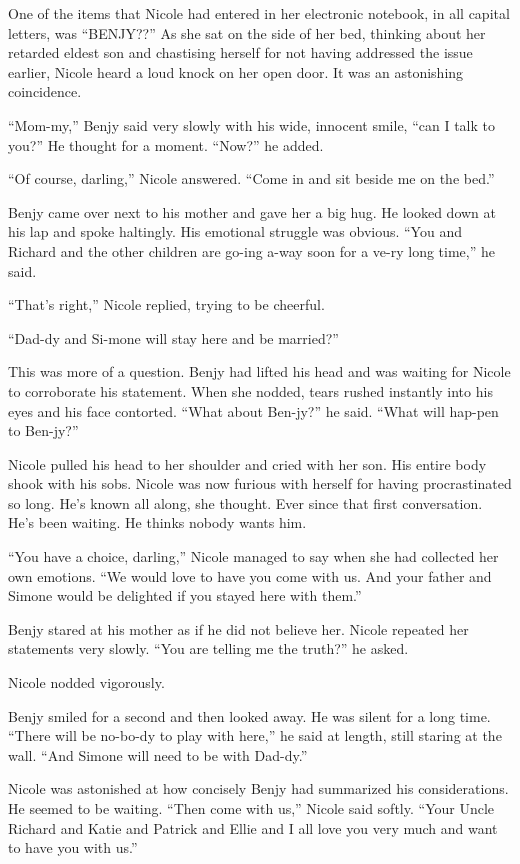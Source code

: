 \documentclass[]{article}
\begin{document}
{One of the items that Nicole had entered in her electronic notebook, in all capital letters, was “BENJY??” As she sat on the side of her bed, thinking about her retarded eldest son and chastising herself for not having addressed the issue earlier, Nicole heard a loud knock on her open door. It was an astonishing coincidence.

“Mom-my,” Benjy said very slowly with his wide, innocent smile, “can I talk to you?” He thought for a moment. “Now?” he added.

“Of course, darling,” Nicole answered. “Come in and sit beside me on the bed.”

Benjy came over next to his mother and gave her a big hug. He looked down at his lap and spoke haltingly. His emotional struggle was obvious. “You and Richard and the other children are go-ing a-way soon for a ve-ry long time,” he said.

“That’s right,” Nicole replied, trying to be cheerful.

“Dad-dy and Si-mone will stay here and be married?”

This was more of a question. Benjy had lifted his head and was waiting for Nicole to corroborate his statement. When she nodded, tears rushed instantly into his eyes and his face contorted. “What about Ben-jy?” he said. “What will hap-pen to Ben-jy?”

Nicole pulled his head to her shoulder and cried with her son. His entire body shook with his sobs. Nicole was now furious with herself for having procrastinated so long. He’s known all along, she thought. Ever since that first conversation. He’s been waiting. He thinks nobody wants him.

“You have a choice, darling,” Nicole managed to say when she had collected her own emotions. “We would love to have you come with us. And your father and Simone would be delighted if you stayed here with them.”

Benjy stared at his mother as if he did not believe her. Nicole repeated her statements very slowly. “You are telling me the truth?” he asked.

Nicole nodded vigorously.

Benjy smiled for a second and then looked away. He was silent for a long time. “There will be no-bo-dy to play with here,” he said at length, still staring at the wall. “And Simone will need to be with Dad-dy.”

Nicole was astonished at how concisely Benjy had summarized his considerations. He seemed to be waiting. “Then come with us,” Nicole said softly. “Your Uncle Richard and Katie and Patrick and Ellie and I all love you very much and want to have you with us.”

}
\end{document}
